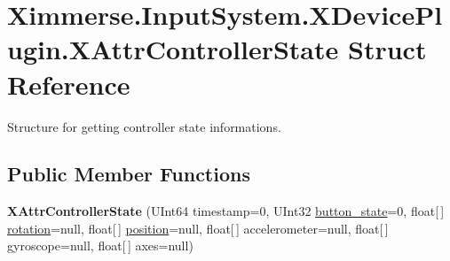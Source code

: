 \hypertarget{struct_ximmerse_1_1_input_system_1_1_x_device_plugin_1_1_x_attr_controller_state}{}\section{Ximmerse.\+Input\+System.\+X\+Device\+Plugin.\+X\+Attr\+Controller\+State Struct Reference}
\label{struct_ximmerse_1_1_input_system_1_1_x_device_plugin_1_1_x_attr_controller_state}


Structure for getting controller state informations.  


\subsection*{Public Member Functions}
\begin{DoxyCompactItemize}
\item 
\mbox{\label{struct_ximmerse_1_1_input_system_1_1_x_device_plugin_1_1_x_attr_controller_state_a0d0e01e4269c6aabdee3d64df96d488f}} 
{\bfseries X\+Attr\+Controller\+State} (U\+Int64 timestamp=0, U\+Int32 \mbox{\hyperlink{struct_ximmerse_1_1_input_system_1_1_x_device_plugin_1_1_x_attr_controller_state_a80646b620537b58fac7094628da3e088}{button\+\_\+state}}=0, float\mbox{[}$\,$\mbox{]} \mbox{\hyperlink{struct_ximmerse_1_1_input_system_1_1_x_device_plugin_1_1_x_attr_controller_state_a1a2b53ae0c6361f5ad38f64938f7a3c7}{rotation}}=null, float\mbox{[}$\,$\mbox{]} \mbox{\hyperlink{struct_ximmerse_1_1_input_system_1_1_x_device_plugin_1_1_x_attr_controller_state_a94a05fbcdd58de8d921b7df134827f14}{position}}=null, float\mbox{[}$\,$\mbox{]} accelerometer=null, float\mbox{[}$\,$\mbox{]} gyroscope=null, float\mbox{[}$\,$\mbox{]} axes=null)
\end{DoxyCompactItemize}
